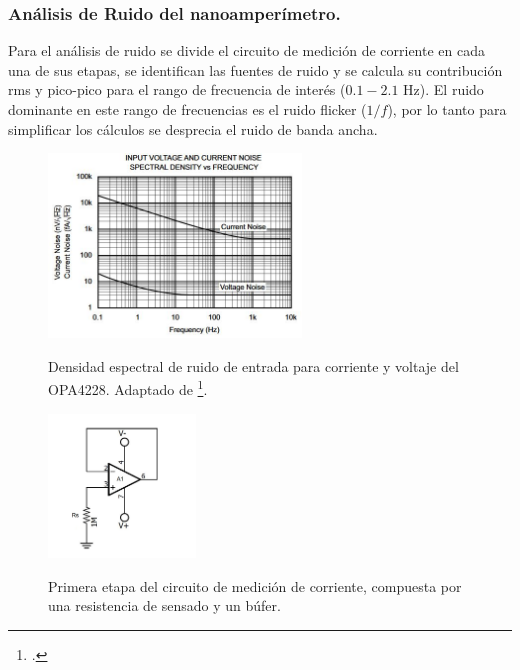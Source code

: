\subsubsection{Análisis de Ruido del nanoamperímetro.}
Para el análisis de ruido se divide el circuito de medición de corriente en cada una de sus etapas, se identifican las fuentes de ruido y se calcula su contribución rms y pico-pico para el rango de frecuencia de interés ($0.1-2.1 $ Hz). El ruido dominante en este rango de frecuencias es el ruido flicker ($1/f$), por lo tanto para simplificar los cálculos se desprecia el ruido de banda ancha.
\begin{figure}[h!]
\begin{centering}

    \caption{Densidad espectral de ruido de entrada para corriente y voltaje del OPA4228. Adaptado de \footcite{OPA_4228}. }
    \includegraphics[width=0.6\textwidth]{Images/Noise_opa.JPG}
    \label{fig:noise_espectral}
  \par\end{centering}
\end{figure}
\begin{figure}[h!]
\begin{centering}
    \caption{Primera etapa del circuito de medición de corriente, compuesta por una resistencia de sensado y un búfer. }
    \includegraphics[width=0.35\textwidth]{Images/ammeter_buffer.JPG}
    \label{fig:ammeter_buffer}
  \par\end{centering}
\end{figure}
